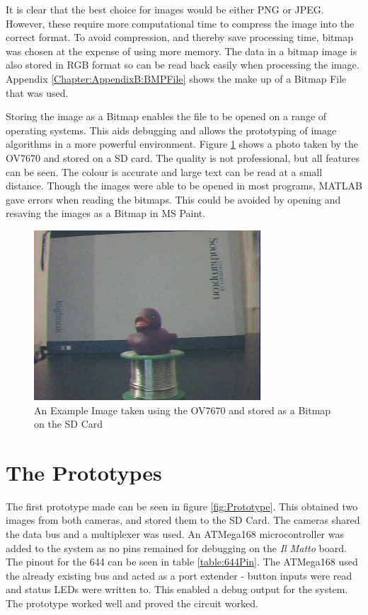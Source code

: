 It is clear that the best choice for images would be either PNG or JPEG. However, these require more computational time to compress the image into the correct format. To avoid compression, and thereby save processing time, bitmap was chosen at the expense of using more memory. The data in a bitmap image is also stored in RGB format so can be read back easily when processing the image. Appendix \ref{Chapter:AppendixB:BMPFile} shows the make up of a Bitmap File that was used.

Storing the image as a Bitmap enables the file to be opened on a range of operating systems. This aids debugging and allows the prototyping of image algorithms in a more powerful environment. Figure \ref{ExampleImage} shows a photo taken by the OV7670 and stored on a SD card. The quality is not professional, but all features can be seen. The colour is accurate and large text can be read at a small distance. Though the images were able to be opened in most programs, MATLAB gave errors when reading the bitmaps. This could be avoided by opening and resaving the images as a Bitmap in MS Paint.

\begin{figure}
\begin{center}
\includegraphics{Figures/ExampleImageFromCamera.jpg} 
\end{center}
\caption{An Example Image taken using the OV7670 and stored as a Bitmap on the SD Card}
\label{ExampleImage}
\end{figure}

\section{The Prototypes}

The first prototype made can be seen in figure \ref{fig:Prototype}. This obtained two images from both cameras, and stored them to the SD Card. The cameras shared the data bus and a \itc multiplexer was used. An ATMega168 microcontroller was added to the system as no pins remained for debugging on the \textit{Il Matto} board. The pinout for the 644 can be seen in table \ref{table:644Pin}. The ATMega168 used the already existing \itc bus and acted as a port extender - button inputs were read and status LEDs were written to. This enabled a debug output for the system. The prototype worked well and proved the circuit worked. 

